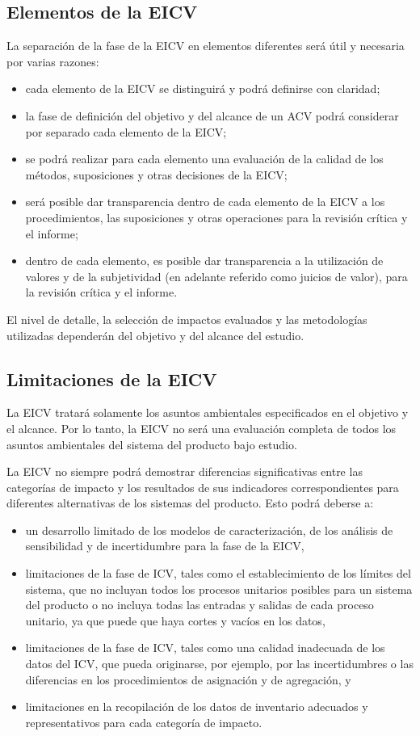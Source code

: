 \subsection{Elementos de la EICV}
La separación de la fase de la EICV en elementos diferentes será útil y necesaria por varias razones:
\begin{itemize}
  \item cada elemento de la EICV se distinguirá y podrá definirse con claridad;
  \item la fase de definición del objetivo y del alcance de un ACV podrá considerar por separado cada elemento de la EICV;
  \item se podrá realizar para cada elemento una evaluación de la calidad de los métodos, suposiciones y otras decisiones de la EICV;
  \item será posible dar transparencia dentro de cada elemento de la EICV a los procedimientos, las suposiciones y otras operaciones para la revisión crítica y el informe;
  \item dentro de cada elemento, es posible dar transparencia a la utilización de valores y de la subjetividad (en adelante referido como juicios de valor), para la revisión crítica y el informe.
\end{itemize}

El nivel de detalle, la selección de impactos evaluados y las metodologías utilizadas dependerán del objetivo y del alcance del estudio.

\subsection{Limitaciones de la EICV}
La EICV tratará solamente los asuntos ambientales especificados en el objetivo y el alcance. Por lo tanto, la EICV no será una evaluación completa de todos los asuntos ambientales del sistema del producto bajo estudio.

La EICV no siempre podrá demostrar diferencias significativas entre las categorías de impacto y los resultados de sus indicadores correspondientes para diferentes alternativas de los sistemas del producto. Esto podrá deberse a:
\begin{itemize}
  \item un desarrollo limitado de los modelos de caracterización, de los análisis de sensibilidad y de incertidumbre para la fase de la EICV,
  \item limitaciones de la fase de ICV, tales como el establecimiento de los límites del sistema, que no incluyan todos los procesos unitarios posibles para un sistema del producto o no incluya todas las entradas y salidas de cada proceso unitario, ya que puede que haya cortes y vacíos en los datos,
  \item limitaciones de la fase de ICV, tales como una calidad inadecuada de los datos del ICV, que pueda originarse, por ejemplo, por las incertidumbres o las diferencias en los procedimientos de asignación y de agregación, y
  \item limitaciones en la recopilación de los datos de inventario adecuados y representativos para cada categoría de impacto.
\end{itemize}

